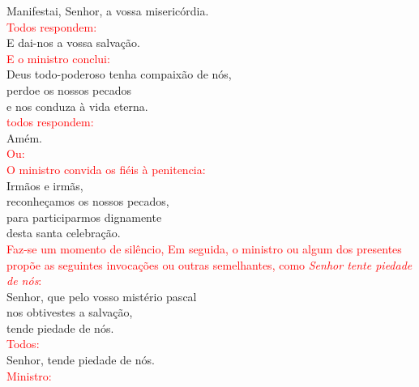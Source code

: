\documentclass{book}
\begin{document}
\begin{flushleft}
    Manifestai, Senhor, a vossa misericórdia.
    \vspace{.1cm} \\
    \textcolor{red}{Todos respondem:}
    \vspace{.1cm} \\
    E dai-nos a vossa salvação.
    \vspace{.1cm} \\
    \textcolor{red}{E o ministro conclui:}
    \vspace{.1cm} \\
    Deus todo-poderoso tenha compaixão de nós, \\
    perdoe os nossos pecados \\
    e nos conduza à vida eterna.
    \vspace{.1cm} \\
    \textcolor{red}{todos respondem:}
    \vspace{.1cm} \\
    Amém.
    \vspace{.1cm} \\
    \textcolor{red}{Ou:}
    \vspace{.1cm} \\
    \textcolor{red}{O ministro convida os fiéis à penitencia:}
    \vspace{.1cm} \\
    Irmãos e irmãs, \\
    reconheçamos os nossos pecados, \\
    para participarmos dignamente \\
    desta santa celebração.
    \vspace{.1cm} \\
    \textcolor{red}{Faz-se um momento de silêncio, Em seguida, o ministro ou algum dos presentes propõe as seguintes invocações ou outras semelhantes, como \textit{Senhor tente piedade de nós}:}
    \vspace{.1cm} \\
    Senhor, que pelo vosso mistério pascal \\
    nos obtivestes a salvação, \\
    tende piedade de nós.
    \vspace{.1cm} \\
    \textcolor{red}{Todos:}
    \vspace{.1cm} \\
    Senhor, tende piedade de nós.
    \vspace{.1cm} \\
    \textcolor{red}{Ministro:}

\end{flushleft}
\end{document}
